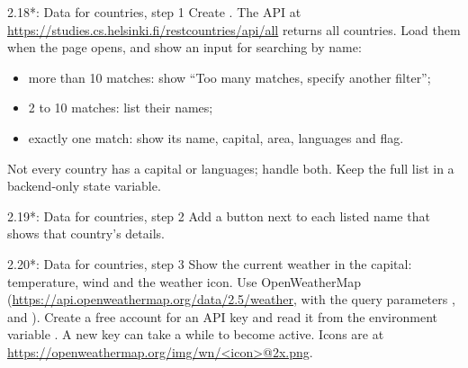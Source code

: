 \begin{exercise}{2.18*: Data for countries, step 1}
Create . The API at \url{https://studies.cs.helsinki.fi/restcountries/api/all} returns all countries. Load them when the page opens, and show an input for searching by name:
\begin{itemize}
\item more than 10 matches: show ``Too many matches, specify another filter'';
\item 2 to 10 matches: list their names;
\item exactly one match: show its name, capital, area, languages and flag.
\end{itemize}
Not every country has a capital or languages; handle both. Keep the full list in a backend-only state variable.
\end{exercise}

\begin{exercise}{2.19*: Data for countries, step 2}
Add a  button next to each listed name that shows that country's details.
\end{exercise}

\begin{exercise}{2.20*: Data for countries, step 3}
Show the current weather in the capital: temperature, wind and the weather icon. Use OpenWeatherMap (\url{https://api.openweathermap.org/data/2.5/weather}, with the query parameters ,  and ). Create a free account for an API key and read it from the environment variable . A new key can take a while to become active. Icons are at \url{https://openweathermap.org/img/wn/<icon>@2x.png}.
\end{exercise}
